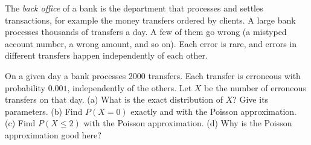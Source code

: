 
\begin{problem}
	\begin{context}
		The \emph{back office} of a bank is the department that processes and
		settles transactions, for example the money transfers ordered by
		clients. A large bank processes thousands of transfers a day. A few of
		them go wrong (a mistyped account number, a wrong amount, and so on).
		Each error is rare, and errors in different transfers happen
		independently of each other.
	\end{context}
	On a given day a bank processes 2000 transfers. Each transfer is erroneous
	with probability $0.001$, independently of the others. Let $X$ be the
	number of erroneous transfers on that day.
	(a) What is the exact distribution of $X$? Give its parameters.
	(b) Find $P(X=0)$ exactly and with the Poisson approximation.
	(c) Find $P(X\le 2)$ with the Poisson approximation.
	(d) Why is the Poisson approximation good here?
\end{problem}

